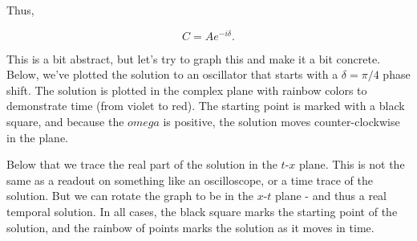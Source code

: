 \documentclass[11pt]{article}
\begin{document}
Thus,

\[C = Ae^{-i\delta}.\]

    This is a bit abstract, but let's try to graph this and make it a bit
concrete. Below, we've plotted the solution to an oscillator that starts
with a \(\delta = \pi/4\) phase shift. The solution is plotted in the
complex plane with rainbow colors to demonstrate time (from violet to
red). The starting point is marked with a black square, and because the
\(omega\) is positive, the solution moves counter-clockwise in the
plane.

Below that we trace the real part of the solution in the \(t\)-\(x\)
plane. This is not the same as a readout on something like an
oscilloscope, or a time trace of the solution. But we can rotate the
graph to be in the \(x\)-\(t\) plane - and thus a real temporal
solution. In all cases, the black square marks the starting point of the
solution, and the rainbow of points marks the solution as it moves in
time.
\end{document}
